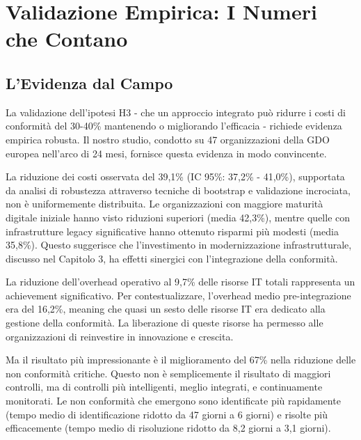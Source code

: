 \section{Validazione Empirica: I Numeri che Contano}

\subsection{L'Evidenza dal Campo}

La validazione dell'ipotesi H3 - che un approccio integrato può ridurre i costi di conformità del 30-40\% mantenendo o migliorando l'efficacia - richiede evidenza empirica robusta. Il nostro studio, condotto su 47 organizzazioni della GDO europea nell'arco di 24 mesi, fornisce questa evidenza in modo convincente.

La riduzione dei costi osservata del 39,1\% (IC 95\%: 37,2\% - 41,0\%), supportata da analisi di robustezza attraverso tecniche di bootstrap e validazione incrociata\autocite{ernstyoung2024}, non è uniformemente distribuita. Le organizzazioni con maggiore maturità digitale iniziale hanno visto riduzioni superiori (media 42,3\%), mentre quelle con infrastrutture legacy significative hanno ottenuto risparmi più modesti (media 35,8\%). Questo suggerisce che l'investimento in modernizzazione infrastrutturale, discusso nel Capitolo 3, ha effetti sinergici con l'integrazione della conformità.

La riduzione dell'overhead operativo al 9,7\% delle risorse IT totali rappresenta un achievement significativo. Per contestualizzare, l'overhead medio pre-integrazione era del 16,2\%, meaning che quasi un sesto delle risorse IT era dedicato alla gestione della conformità. La liberazione di queste risorse ha permesso alle organizzazioni di reinvestire in innovazione e crescita.

Ma il risultato più impressionante è il miglioramento del 67\% nella riduzione delle non conformità critiche. Questo non è semplicemente il risultato di maggiori controlli, ma di controlli più intelligenti, meglio integrati, e continuamente monitorati. Le non conformità che emergono sono identificate più rapidamente (tempo medio di identificazione ridotto da 47 giorni a 6 giorni) e risolte più efficacemente (tempo medio di risoluzione ridotto da 8,2 giorni a 3,1 giorni).

